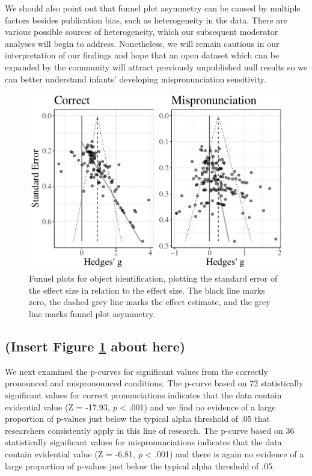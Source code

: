 \documentclass[man]{apa6}
\begin{document}
We should also point out that funnel plot asymmetry can be caused by multiple factors besides publication bias, such as heterogeneity in the data. There are various possible sources of heterogeneity, which our subsequent moderator analyses will begin to address. Nonetheless, we will remain cautious in our interpretation of our findings and hope that an open dataset which can be expanded by the community will attract previously unpublished null results so we can better understand infants' developing mispronunciation sensitivity.

\begin{figure}
\centering
\includegraphics{VonHolzenBergmann_MPMetaAnalysis_files/figure-latex/FunnelCombo-1.pdf}
\caption{\label{fig:FunnelCombo}Funnel plots for object identification, plotting the standard error of the effect size in relation to the effect size. The black line marks zero, the dashed grey line marks the effect estimate, and the grey line marks funnel plot asymmetry.}
\end{figure}

\hypertarget{insert-figure-reffigfunnelcombo-about-here}{%
\subsection{(Insert Figure \ref{fig:FunnelCombo} about here)}\label{insert-figure-reffigfunnelcombo-about-here}}

We next examined the p-curves for significant values from the correctly pronounced and mispronounced conditions. The p-curve based on 72 statistically significant values for correct pronunciations indicates that the data contain evidential value (Z = -17.93, \emph{p} \textless{} .001) and we find no evidence of a large proportion of p-values just below the typical alpha threshold of .05 that researchers consistently apply in this line of research. The p-curve based on 36 statistically significant values for mispronunciations indicates that the data contain evidential value (Z = -6.81, \emph{p} \textless{} .001) and there is again no evidence of a large proportion of p-values just below the typical alpha threshold of .05.
\end{document}
